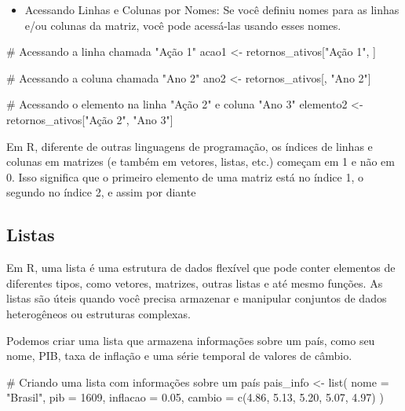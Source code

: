 \documentclass[
  letterpaper,
  DIV=11,
  numbers=noendperiod]{scrreprt}
\newenvironment{Shaded}{\begin{snugshade}}{\end{snugshade}}
\newcommand{\AttributeTok}[1]{\textcolor[rgb]{0.40,0.45,0.13}{#1}}
\newcommand{\CommentTok}[1]{\textcolor[rgb]{0.37,0.37,0.37}{#1}}
\newcommand{\DecValTok}[1]{\textcolor[rgb]{0.68,0.00,0.00}{#1}}
\newcommand{\FloatTok}[1]{\textcolor[rgb]{0.68,0.00,0.00}{#1}}
\newcommand{\FunctionTok}[1]{\textcolor[rgb]{0.28,0.35,0.67}{#1}}
\newcommand{\NormalTok}[1]{\textcolor[rgb]{0.00,0.23,0.31}{#1}}
\newcommand{\OtherTok}[1]{\textcolor[rgb]{0.00,0.23,0.31}{#1}}
\newcommand{\StringTok}[1]{\textcolor[rgb]{0.13,0.47,0.30}{#1}}
\providecommand{\tightlist}{%
  \setlength{\itemsep}{0pt}\setlength{\parskip}{0pt}}\usepackage{longtable,booktabs,array}
\begin{document}
\begin{itemize}
\tightlist
\item
  Acessando Linhas e Colunas por Nomes: Se você definiu nomes para as
  linhas e/ou colunas da matriz, você pode acessá-las usando esses
  nomes.
\end{itemize}

\begin{Shaded}
\begin{Highlighting}[]
\CommentTok{\# Acessando a linha chamada "Ação 1"}
\NormalTok{acao1 }\OtherTok{\textless{}{-}}\NormalTok{ retornos\_ativos[}\StringTok{"Ação 1"}\NormalTok{, ]}

\CommentTok{\# Acessando a coluna chamada "Ano 2"}
\NormalTok{ano2 }\OtherTok{\textless{}{-}}\NormalTok{ retornos\_ativos[, }\StringTok{"Ano 2"}\NormalTok{]}

\CommentTok{\# Acessando o elemento na linha "Ação 2" e coluna "Ano 3"}
\NormalTok{elemento2 }\OtherTok{\textless{}{-}}\NormalTok{ retornos\_ativos[}\StringTok{"Ação 2"}\NormalTok{, }\StringTok{"Ano 3"}\NormalTok{]}
\end{Highlighting}
\end{Shaded}

Em R, diferente de outras linguagens de programação, os índices de
linhas e colunas em matrizes (e também em vetores, listas, etc.) começam
em 1 e não em 0. Isso significa que o primeiro elemento de uma matriz
está no índice 1, o segundo no índice 2, e assim por diante

\hypertarget{listas}{%
\subsection{Listas}\label{listas}}

Em R, uma lista é uma estrutura de dados flexível que pode conter
elementos de diferentes tipos, como vetores, matrizes, outras listas e
até mesmo funções. As listas são úteis quando você precisa armazenar e
manipular conjuntos de dados heterogêneos ou estruturas complexas.

Podemos criar uma lista que armazena informações sobre um país, como seu
nome, PIB, taxa de inflação e uma série temporal de valores de câmbio.

\begin{Shaded}
\begin{Highlighting}[]
\CommentTok{\# Criando uma lista com informações sobre um país}
\NormalTok{pais\_info }\OtherTok{\textless{}{-}} \FunctionTok{list}\NormalTok{(}
  \AttributeTok{nome =} \StringTok{"Brasil"}\NormalTok{,}
  \AttributeTok{pib =} \DecValTok{1609}\NormalTok{,}
  \AttributeTok{inflacao =} \FloatTok{0.05}\NormalTok{,}
  \AttributeTok{cambio =} \FunctionTok{c}\NormalTok{(}\FloatTok{4.86}\NormalTok{, }\FloatTok{5.13}\NormalTok{, }\FloatTok{5.20}\NormalTok{, }\FloatTok{5.07}\NormalTok{, }\FloatTok{4.97}\NormalTok{)}
\NormalTok{)}
\end{Highlighting}
\end{Shaded}
\end{document}
